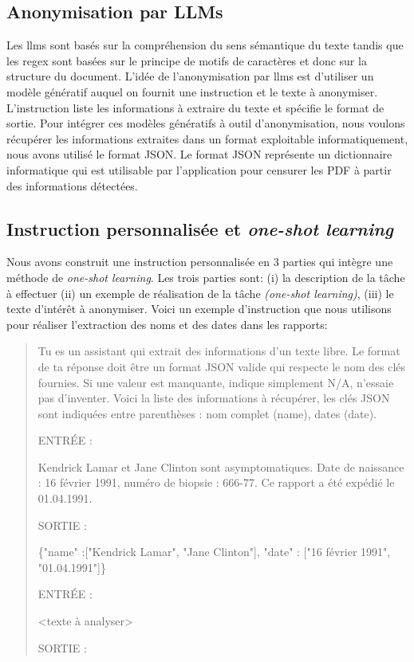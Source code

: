\subsection{Anonymisation par LLMs}
Les \gls{llms} sont basés sur la compréhension du sens sémantique du texte tandis que les \gls{regex} sont basées sur le principe de motifs de caractères et donc sur la structure du document. L'idée de l'anonymisation par \gls{llms} est d'utiliser un modèle génératif auquel on fournit une instruction et le texte à anonymiser. L'instruction liste les informations à extraire du texte et spécifie le format de sortie. Pour intégrer ces modèles génératifs à outil d'anonymisation, nous voulons récupérer les informations extraites dans un format exploitable informatiquement, nous avons utilisé le format JSON. Le format JSON représente un dictionnaire informatique qui est utilisable par l'application pour censurer les PDF à partir des informations détectées.

\subsection{Instruction personnalisée et \textit{one-shot learning}}
Nous avons construit une instruction personnalisée en 3 parties qui intègre une méthode de \textit{one-shot learning}. Les trois parties sont: (i) la description de la tâche à effectuer (ii) un exemple de réalisation de la tâche \textit{(one-shot learning)}, (iii) le texte d'intérêt à anonymiser.
Voici un exemple d'instruction que nous utilisons pour réaliser l'extraction des noms et des dates dans les rapports:
\begin{quote}
Tu es un assistant qui extrait des informations d'un texte libre. Le format de ta réponse doit être un format JSON valide qui respecte le nom des clés fournies. Si une valeur est manquante, indique simplement N/A, n'essaie pas d'inventer. Voici la liste des informations à récupérer, les clés JSON sont indiquées entre parenthèses : nom complet (name), dates (date).

ENTRÉE :

Kendrick Lamar et Jane Clinton sont asymptomatiques. Date de naissance : 16 février 1991, numéro de biopsie : 666-77. Ce rapport a été expédié le 01.04.1991.

SORTIE :

\{"name" :["Kendrick Lamar", "Jane Clinton"], "date" : ["16 février 1991", "01.04.1991"]\}

ENTRÉE :

<texte à analyser>

SORTIE :
\end{quote}

